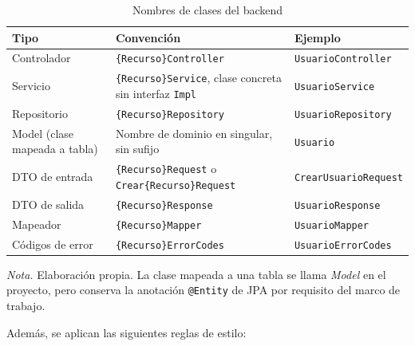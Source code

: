 \begin{table}[H]
\caption{Nombres de clases del backend}
\label{tab:estandar_clases_java}
\begin{threeparttable}
\begin{tabular}{>{\raggedright\arraybackslash}p{3.2cm} >{\raggedright\arraybackslash}p{5.0cm} >{\raggedright\arraybackslash}p{4.6cm}}
\toprule
Tipo & Convención & Ejemplo \\
\midrule
Controlador & \texttt{\{Recurso\}Controller} & \texttt{UsuarioController} \\
Servicio & \texttt{\{Recurso\}Service}, clase concreta sin interfaz \texttt{Impl} & \texttt{UsuarioService} \\
Repositorio & \texttt{\{Recurso\}Repository} & \texttt{UsuarioRepository} \\
Model (clase mapeada a tabla) & Nombre de dominio en singular, sin sufijo & \texttt{Usuario} \\
DTO de entrada & \texttt{\{Recurso\}Request} o \texttt{Crear\{Recurso\}Request} & \texttt{CrearUsuarioRequest} \\
DTO de salida & \texttt{\{Recurso\}Response} & \texttt{UsuarioResponse} \\
Mapeador & \texttt{\{Recurso\}Mapper} & \texttt{UsuarioMapper} \\
Códigos de error & \texttt{\{Recurso\}ErrorCodes} & \texttt{UsuarioErrorCodes} \\
\bottomrule
\end{tabular}
\begin{tablenotes}
\item \textit{Nota.} Elaboración propia. La clase mapeada a una tabla se llama \textit{Model} en el proyecto, pero conserva la anotación \texttt{@Entity} de JPA por requisito del marco de trabajo.
\end{tablenotes}
\end{threeparttable}
\end{table}

Además, se aplican las siguientes reglas de estilo:

